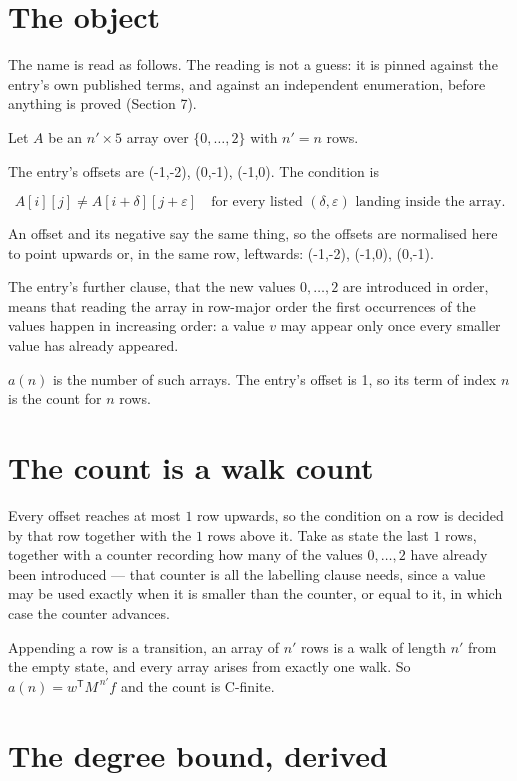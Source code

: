 \documentclass[11pt]{article}
\theoremstyle{definition}
\begin{document}
\section{The object}

The name is read as follows. The reading is not a guess: it is pinned against the entry's own published terms, and against an independent enumeration, before anything is proved (Section 7).

Let $A$ be an $n' \times 5$ array over $\{0,\dots,2\}$ with $n' = n$ rows.

The entry's offsets are (-1,-2), (0,-1), (-1,0). The condition is

\[A[i][j] \ne A[i{+}\delta][j{+}\varepsilon]\quad\text{for every listed }(\delta,\varepsilon)\text{ landing inside the array.}\]

An offset and its negative say the same thing, so the offsets are normalised here to point upwards or, in the same row, leftwards: (-1,-2), (-1,0), (0,-1).

The entry's further clause, that the new values $0,\dots,2$ are introduced in order, means that reading the array in row-major order the first occurrences of the values happen in increasing order: a value $v$ may appear only once every smaller value has already appeared.

$a(n)$ is the number of such arrays. The entry's offset is 1, so its term of index $n$ is the count for $n$ rows.

\section{The count is a walk count}

Every offset reaches at most $1$ row upwards, so the condition on a row is decided by that row together with the $1$ rows above it. Take as state the last $1$ rows, together with a counter recording how many of the values $0,\dots,2$ have already been introduced --- that counter is all the labelling clause needs, since a value may be used exactly when it is smaller than the counter, or equal to it, in which case the counter advances.

Appending a row is a transition, an array of $n'$ rows is a walk of length $n'$ from the empty state, and every array arises from exactly one walk. So $a(n) = w^{\mathsf T}M^{\,n'}f$ and the count is C-finite.

\section{The degree bound, derived}
\end{document}
